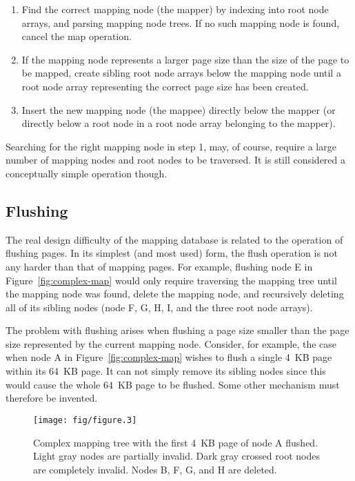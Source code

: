 \documentclass[a4paper,twoside]{book}
\begin{document}
\begin{enumerate}
\item Find the correct mapping node (the mapper) by indexing into root
  node arrays, and parsing mapping node trees.  If no such mapping
  node is found, cancel the map operation.
\item If the mapping node represents a larger page size than the size
  of the page to be mapped, create sibling root node arrays below the
  mapping node until a root node array representing the correct page
  size has been created.
\item Insert the new mapping node (the mappee) directly below the
  mapper (or directly below a root node in a root node array belonging
  to the mapper).
\end{enumerate}

Searching for the right mapping node in step 1, may, of course,
require a large number of mapping nodes and root nodes to be
traversed.  It is still considered a conceptually simple operation
though.


\subsection{Flushing}
\label{sec:Flushing}

The real design difficulty of the mapping database is related to the
operation of flushing pages.  In its simplest (and most used) form,
the flush operation is not any harder than that of mapping pages.  For
example, flushing node E in Figure~\ref{fig:complex-map} would only
require traversing the mapping tree until the mapping node was found,
delete the mapping node, and recursively deleting all of its sibling
nodes (node F, G, H, I, and the three root node arrays).

The problem with flushing arises when flushing a page size smaller
than the page size represented by the current mapping node.  Consider,
for example, the case when node A in Figure~\ref{fig:complex-map}
wishes to flush a single 4~KB page within its 64~KB page.  It can not
simply remove its sibling nodes since this would cause the whole 64~KB
page to be flushed.  Some other mechanism must therefore be invented.

\begin{figure}[t]
  \begin{center}
    \texttt{[image: fig/figure.3]}
    \caption[Complex mapping tree with a 4~KB page flushed]{Complex
      mapping tree with the first 4~KB page of node A flushed.  Light
      gray nodes are partially invalid.  Dark gray crossed root nodes
      are completely invalid.  Nodes B, F, G, and H are deleted.}
    \label{fig:complex-map-4kb}
  \end{center}
\end{figure}
\end{document}
